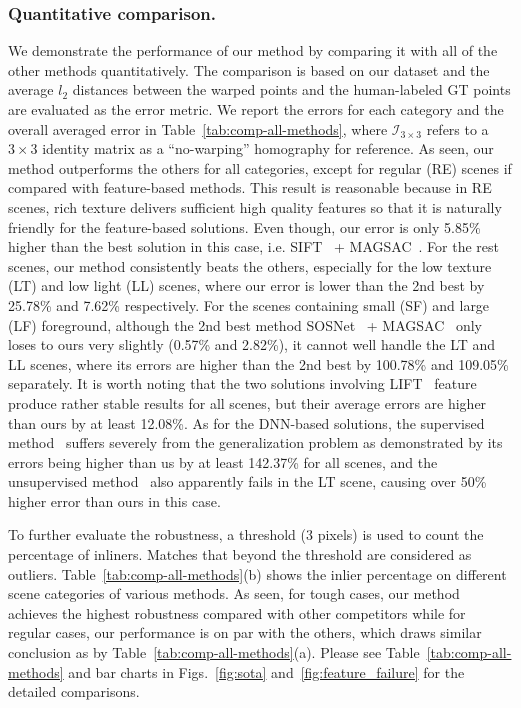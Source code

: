 \documentclass[runningheads]{llncs}
\begin{document}
\subsubsection{Quantitative comparison.}


We demonstrate the performance of our method by comparing it with all of the other methods quantitatively. The comparison is based on our dataset and the average $l_2$ distances between the warped points and the human-labeled GT points are evaluated as the error metric. We report the errors for each category and the overall averaged error in Table~\ref{tab:comp-all-methods}, where $\mathcal{I}_{3\times3}$ refers to a $3\times3$ identity matrix as a ``no-warping'' homography for reference. As seen, our method outperforms the others for all categories, except for regular (RE) scenes if compared with feature-based methods. This result is reasonable because in RE scenes, rich texture delivers sufficient high quality features so that it is naturally friendly for the feature-based solutions. Even though, our error is only 5.85\% higher than the best solution in this case, i.e. SIFT~\cite{lowe2004distinctive} + MAGSAC~\cite{barath2019magsac}. For the rest scenes, our method consistently beats the others, especially for the low texture (LT) and low light (LL) scenes, where our error is lower than the 2nd best by 25.78\% and 7.62\% respectively. For the scenes containing small (SF) and large (LF) foreground, although the 2nd best method SOSNet~\cite{tian2019sosnet} + MAGSAC~\cite{barath2019magsac} only loses to ours very slightly (0.57\% and 2.82\%), it cannot well handle the LT and LL scenes, where its errors are higher than the 2nd best by 100.78\% and 109.05\% separately.
It is worth noting that the two solutions involving LIFT~\cite{yi2016lift} feature produce rather stable results for all scenes, but their average errors are higher than ours by at least 12.08\%. As for the DNN-based solutions, the supervised method~\cite{detone2016deep} suffers severely from the generalization problem as demonstrated by its errors being higher than us by at least 142.37\% for all scenes, and the unsupervised method~\cite{nguyen2018unsupervised} also apparently fails in the LT scene, causing over 50\% higher error than ours in this case.

To further evaluate the robustness, a threshold ($3$ pixels) is used to count the percentage of inliners.  Matches that beyond the threshold are considered as outliers. Table~\ref{tab:comp-all-methods}(b) shows the inlier percentage on different scene categories of various methods. As seen, for tough cases, our method achieves the highest robustness compared with other competitors while for regular cases, our performance is on par with the others, which draws similar conclusion as by Table~\ref{tab:comp-all-methods}(a).
Please see Table~\ref{tab:comp-all-methods} and bar charts in Figs.~\ref{fig:sota} and~\ref{fig:feature_failure} for the detailed comparisons.
\end{document}

